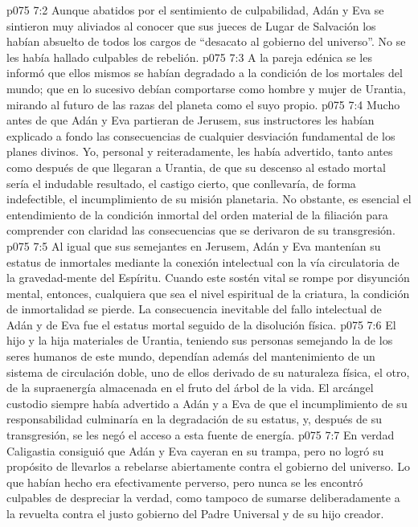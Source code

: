 \vs p075 7:2 Aunque abatidos por el sentimiento de culpabilidad, Adán y Eva se sintieron muy aliviados al conocer que sus jueces de Lugar de Salvación los habían absuelto de todos los cargos de “desacato al gobierno del universo”. No se les había hallado culpables de rebelión.
\vs p075 7:3 A la pareja edénica se les informó que ellos mismos se habían degradado a la condición de los mortales del mundo; que en lo sucesivo debían comportarse como hombre y mujer de Urantia, mirando al futuro de las razas del planeta como el suyo propio.
\vs p075 7:4 Mucho antes de que Adán y Eva partieran de Jerusem, sus instructores les habían explicado a fondo las consecuencias de cualquier desviación fundamental de los planes divinos. Yo, personal y reiteradamente, les había advertido, tanto antes como después de que llegaran a Urantia, de que su descenso al estado mortal sería el indudable resultado, el castigo cierto, que conllevaría, de forma indefectible, el incumplimiento de su misión planetaria. No obstante, es esencial el entendimiento de la condición inmortal del orden material de la filiación para comprender con claridad las consecuencias que se derivaron de su transgresión.
\vs p075 7:5 Al igual que sus semejantes en Jerusem, Adán y Eva mantenían su estatus de inmortales mediante la conexión intelectual con la vía circulatoria de la gravedad\hyp{}mente del Espíritu. Cuando este sostén vital se rompe por disyunción mental, entonces, cualquiera que sea el nivel espiritual de la criatura, la condición de inmortalidad se pierde. La consecuencia inevitable del fallo intelectual de Adán y de Eva fue el estatus mortal seguido de la disolución física.
\vs p075 7:6 El hijo y la hija materiales de Urantia, teniendo sus personas semejando la de los seres humanos de este mundo, dependían además del mantenimiento de un sistema de circulación doble, uno de ellos derivado de su naturaleza física, el otro, de la supraenergía almacenada en el fruto del árbol de la vida. El arcángel custodio siempre había advertido a Adán y a Eva de que el incumplimiento de su responsabilidad culminaría en la degradación de su estatus, y, después de su transgresión, se les negó el acceso a esta fuente de energía.
\vs p075 7:7 \pc En verdad Caligastia consiguió que Adán y Eva cayeran en su trampa, pero no logró su propósito de llevarlos a rebelarse abiertamente contra el gobierno del universo. Lo que habían hecho era efectivamente perverso, pero nunca se les encontró culpables de despreciar la verdad, como tampoco de sumarse deliberadamente a la revuelta contra el justo gobierno del Padre Universal y de su hijo creador.
